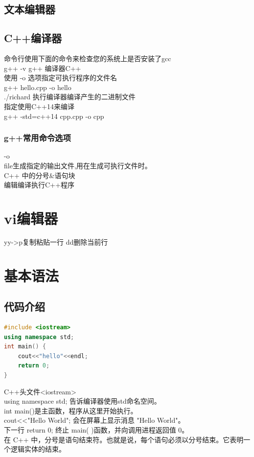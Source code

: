 \documentclass[12pt,twiside,a4paper]{ctexbook}
\numberwithin{chapter}{part}
\begin{document}
\section{文本编辑器}

\section{C++编译器}
命令行使用下面的命令来检查您的系统上是否安装了gcc\\
g++ -v
g++ 编译器C++\\
使用 -o 选项指定可执行程序的文件名\\
g++ hello.cpp -o hello\\
./richard 执行编译器编译产生的二进制文件\\
指定使用C++14来编译\\
g++ -std=c++14 cpp.cpp -o cpp 

\subsection{g++常用命令选项}
-o\\
file生成指定的输出文件,用在生成可执行文件时。\\
C++ 中的分号\&语句块\\
编辑编译执行C++程序

\chapter{vi编辑器}
yy->p复制粘贴一行
dd删除当前行

\chapter{基本语法}
\section{代码介绍}
\begin{lstlisting}[language=C++]
#include <iostream>
using namespace std;
int main() {
	cout<<"hello"<<endl;
	return 0;
}
\end{lstlisting}
C++头文件<iostream>\\
using namespace std; 告诉编译器使用std命名空间。\\
int main()是主函数，程序从这里开始执行。\\
cout<<"Hello World"; 会在屏幕上显示消息 "Hello World"。\\
下一行 return 0; 终止 main( )函数，并向调用进程返回值 0。\\
在 C++ 中，分号是语句结束符。也就是说，每个语句必须以分号结束。它表明一个逻辑实体的结束。
\end{document}
